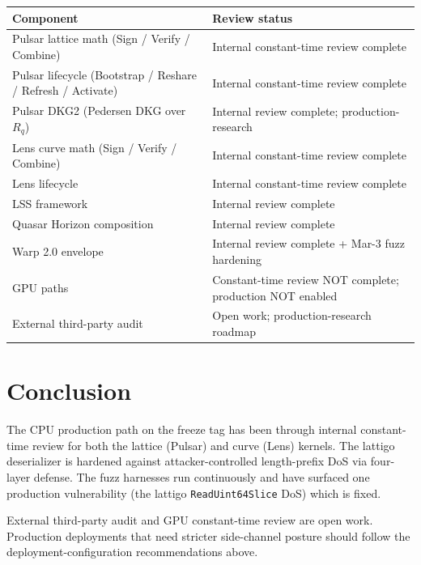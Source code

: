 \documentclass[11pt,a4paper]{article}
\begin{document}
\begin{tabular}{@{}p{}p{}@{}}
  \toprule
  \textbf{Component} & \textbf{Review status} \\
  \midrule
  Pulsar lattice math (Sign / Verify / Combine) & Internal constant-time review complete \\
  Pulsar lifecycle (Bootstrap / Reshare / Refresh / Activate) & Internal constant-time review complete \\
  Pulsar DKG2 (Pedersen DKG over $R_q$) & Internal review complete; production-research \\
  Lens curve math (Sign / Verify / Combine) & Internal constant-time review complete \\
  Lens lifecycle & Internal constant-time review complete \\
  LSS framework & Internal review complete \\
  Quasar Horizon composition & Internal review complete \\
  Warp 2.0 envelope & Internal review complete + Mar-3 fuzz hardening \\
  GPU paths & Constant-time review NOT complete; production NOT enabled \\
  External third-party audit & Open work; production-research roadmap \\
  \bottomrule
\end{tabular}

\section{Conclusion}

The CPU production path on the freeze tag has been through internal constant-time review for both the lattice (Pulsar) and curve (Lens) kernels. The lattigo deserializer is hardened against attacker-controlled length-prefix DoS via four-layer defense. The fuzz harnesses run continuously and have surfaced one production vulnerability (the lattigo \texttt{ReadUint64Slice} DoS) which is fixed.

External third-party audit and GPU constant-time review are open work. Production deployments that need stricter side-channel posture should follow the deployment-configuration recommendations above.



\end{document}
